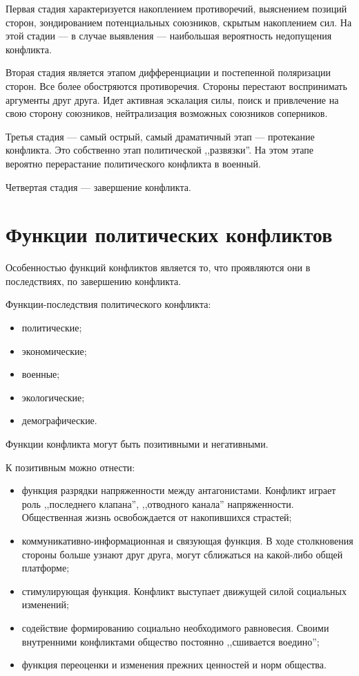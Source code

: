 \documentclass[a4paper,12pt,notitlepage,pdftex,headsepline]{scrartcl}
\begin{document}
  Первая стадия характеризуется накоплением противоречий, выяснением позиций
  сторон, зондированием потенциальных союзников, скрытым накоплением сил.
  На этой стадии --- в случае выявления --- наибольшая вероятность недопущения
  конфликта.

  Вторая стадия является этапом дифференциации и постепенной поляризации
  сторон.
  Все более обостряются противоречия.
  Стороны перестают воспринимать аргументы друг друга.
  Идет активная эскалация силы, поиск и привлечение на свою сторону союзников,
  нейтрализация возможных союзников соперников.

  Третья стадия --- самый острый, самый драматичный этап --- протекание
  конфликта.
  Это собственно этап политической ,,развязки''.
  На этом этапе вероятно перерастание политического конфликта в военный.

  Четвертая стадия --- завершение конфликта.

  \clearpage
\section{Функции политических конфликтов}
  Особенностью функций конфликтов является то, что проявляются они в
  последствиях, по завершению конфликта.

  Функции-последствия политического конфликта:
  \begin{itemize}
    \item политические;
    \item экономические;
    \item военные;
    \item экологические;
    \item демографические.
  \end{itemize}

  Функции конфликта могут быть позитивными и негативными.

  К позитивным можно отнести:
  \begin{itemize}
    \item функция разрядки напряженности между антагонистами.
      Конфликт играет роль ,,последнего клапана'', ,,отводного канала''
      напряженности.
      Общественная жизнь освобождается от накопившихся страстей;
    \item коммуникативно-информационная и связующая функция.
      В ходе столкновения стороны больше узнают друг друга, могут сближаться
      на какой-либо общей платформе;
    \item стимулирующая функция.
      Конфликт выступает движущей силой социальных изменений;
    \item содействие формированию социально необходимого равновесия.
      Своими внутренними конфликтами общество постоянно ,,сшивается
      воедино'';
    \item функция переоценки и изменения прежних ценностей и норм общества.
  \end{itemize}
\end{document}

